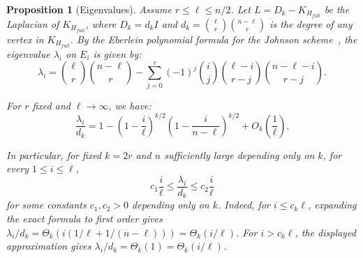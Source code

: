 \documentclass
[11pt,letterpaper]
{article}
\newtheorem{proposition}[theorem]{Proposition}
\begin{document}
\begin{proposition}[Eigenvalues]
Assume $r\leq \ell \leq n/2$. Let $L = D_k - K_{H_{full}}$ be the Laplacian of $K_{H_{full}}$, where $D_k = d_k I$ and $d_k = {\ell \choose r}{{n-\ell} \choose r}$ is the degree of any vertex in $K_{H_{full}}$. By the Eberlein polynomial formula for the Johnson scheme~\cite[Theorem~3.13]{AalipourEtAl16}, the eigenvalue $\lambda_i$ on $E_i$ is given by: 
\[
\lambda_i
=
\binom{\ell}{r}\binom{n-\ell}{r}
-
\sum_{j=0}^{r}
(-1)^j
\binom ij
\binom{\ell-i}{r-j}
\binom{n-\ell-i}{r-j}.
\]

For \(r\) fixed and \(\ell\to\infty\), we have:
\[
\frac{\lambda_i}{d_k}
=
1-
\left(1-\frac{i}{\ell}\right)^{k/2}
\left(1-\frac{i}{n-\ell}\right)^{k/2}
+
O_k\left(\frac1\ell\right).
\]

In particular, for fixed $k=2r$ and $n$ sufficiently large depending only on $k$, for every $1\leq i\leq \ell$,
\[
c_1 \frac{i}{\ell} \leq \frac{\lambda_i}{d_k} \leq c_2 \frac{i}{\ell}
\]
for some constants $c_1,c_2>0$ depending only on $k$. 
Indeed, for $i\leq c_k\ell$, expanding the exact formula to first order gives $\lambda_i/d_k=\Theta_k(i(1/\ell+1/(n-\ell)))=\Theta_k(i/\ell)$. For $i>c_k\ell$, the displayed approximation gives $\lambda_i/d_k=\Theta_k(1)=\Theta_k(i/\ell)$.

\label{prop:eigs-johnson}
\end{proposition}

\end{document}
